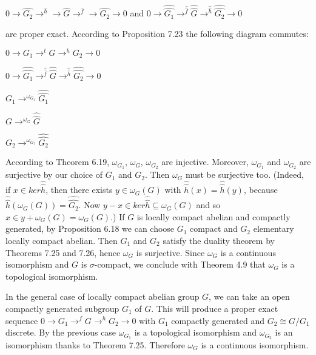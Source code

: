\documentclass[12pt]{article}
\begin{document}
\begin{itemize}
\begin{itemize}
    $0 \to \hat{G_2} \to^{\hat{h}} \to \hat{G} \to^{\hat{f}} \to \hat{G_2} \to 0$ and $0 \to \hat{\hat{G_1}} \to^{\hat{\hat{f}}} \hat{\hat{G}} \to^{\hat{\hat{h}}} \hat{\hat{G_2}} \to 0$


are proper exact. According to Proposition 7.23 the following diagram commutes:




$0 \to G_1 \to^t G \to^h G_2 \to 0$


$0 \to \hat{\hat{G_1}} \to^{\hat{\hat{f}}} \hat{\hat{G}} \to^{\hat{\hat{h}}} \hat{\hat{G_2}} \to 0$


$G_1 \to^{\omega_{G_1}} \hat{\hat{G_1}}$

$G \to^{\omega_G} \hat{\hat{G}}$

$G_2 \to^{\omega_{G_2}} \hat{\hat{G_2}}$


According to Theorem 6.19, $\omega_{G_1}$, $\omega_G$, $\omega_{G_2}$ are injective. Moreover, $\omega_{G_1}$ and $\omega_{G_2}$ are surjective by our
choice of $G_1$ and $G_2$. Then $\omega_G$ must be surjective too. (Indeed, if $x \in ker \hat{\hat{h}}$, then there exists $y \in \omega_G(G)$ with
$\hat{\hat{h}}(x) = \hat{\hat{h}}(y)$, because $\hat{\hat{h}}(\omega_G(G)) = \hat{\hat{G_2}}$. Now $y - x \in ker \hat{\hat{h}} \subseteq \omega_G(G)$ and so $x \in y + \omega_G(G) = \omega_G(G)$.)
If $G$ is locally compact abelian and compactly generated, by Proposition 6.18 we can choose $G_1$ compact
and $G_2$ elementary locally compact abelian. Then $G_1$ and $G_2$ satisfy the duality theorem by Theorems 7.25
and 7.26, hence $\omega_G$ is surjective. Since $\omega_G$ is a continuous isomorphism and $G$ is $\sigma$-compact, we conclude with
Theorem 4.9 that $\omega_G$ is a topological isomorphism.


    In the general case of locally compact abelian group $G$, we can take an open compactly generated subgroup
$G_1$ of $G$. This will produce a proper exact sequence $0 \to G_1 \to^f G \to^h G_2 \to 0$ with $G_1$ compactly generated and
$G_2 \cong G/G_1$ discrete. By the previous case $\omega_{G_1}$ is a topological isomorphism and $\omega_{G_2}$ is an isomorphism thanks
to Theorem 7.25. Therefore $\omega_G$ is a continuous isomorphism.



\end{itemize}
\end{itemize}
\end{document}
